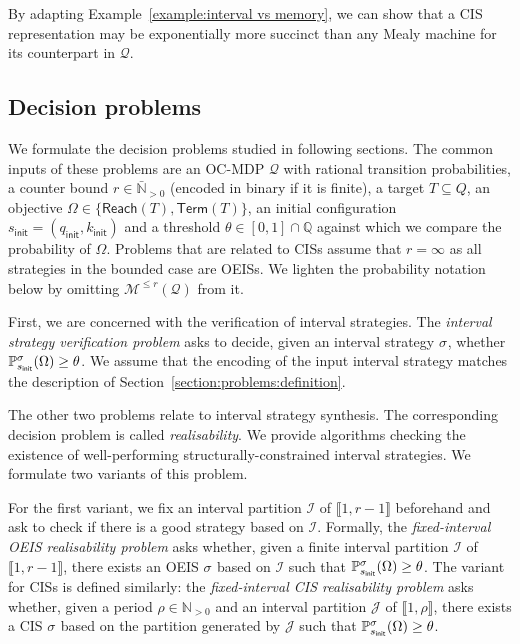 \documentclass[a4paper,UKenglish,cleveref,autoref,thm-restate,colorlinks]{lipics-v2021}
\newcommand{\init}{\mathsf{init}}
\newcommand{\integerInterval}[1]{\llbracket{}#1\rrbracket{}}
\newcommand{\ccInt}[2]{\left[#1, #2\right]}
\newcommand{\IN}{\mathbb{N}}
\newcommand{\INpos}{\IN_{>0}}
\newcommand{\IQ}{\mathbb{Q}}
\newcommand{\INposBar}{\bar{\IN}_{>0}}
\newcommand{\mdp}{\mathcal{M}}
\newcommand{\ocmdp}{\mathcal{Q}}
\newcommand{\ocmdpFin}[2]{\mdp^{\leq #2}(#1)}
\newcommand{\ocStateSpace}{Q}
\newcommand{\ocState}{q}
\newcommand{\ocCount}{k}
\newcommand{\ocConfig}{s}
\newcommand{\counterUB}{r}
\newcommand{\period}{\rho}
\newcommand{\intPart}{\mathcal{I}}
\newcommand{\intPartB}{\mathcal{J}}
\newcommand{\objective}{\Omega}
\newcommand{\reach}[1]{\mathsf{Reach}(#1)}
\newcommand{\target}{T}
\newcommand{\termination}{\mathsf{Term}}
\newcommand{\selectiveTermination}[1]{\termination({#1})}
\newcommand{\thresProba}{\theta}
\newcommand{\stratGeneric}[1]{{\sigma_{#1}}}
\newcommand{\strat}{\stratGeneric{}}
\begin{document}
By adapting Example~\ref{example:interval vs memory}, we can show that a CIS representation may be exponentially more succinct than any Mealy machine for its counterpart in $\ocmdp$.

\subsection{Decision problems}\label{section:problems:statements}

We formulate the decision problems studied in following sections.
The common inputs of these problems are an OC-MDP $\ocmdp$ with rational transition probabilities, a counter bound $\counterUB\in\INposBar$ (encoded in binary if it is finite), a target $\target\subseteq\ocStateSpace$, an objective $\objective\in\{\reach{\target}, \selectiveTermination{\target}\}$, an initial configuration $\ocConfig_\init = (\ocState_\init, \ocCount_\init)$ and a threshold $\thresProba\in\ccInt{0}{1}\cap\IQ$ against which we compare the probability of $\objective$.
Problems that are related to CISs assume that $\counterUB=\infty$ as all strategies in the bounded case are OEISs.
We lighten the probability notation below by omitting $\ocmdpFin{\ocmdp}{\counterUB}$ from it.

First, we are concerned with the verification of interval strategies.
The \textit{interval strategy verification problem} asks to decide, given an interval strategy $\strat$, whether $\probaG{\ocConfig_\init}{\strat}(\objective)\geq\thresProba$.
We assume that the encoding of the input interval strategy matches the description of Section~\ref{section:problems:definition}.

The other two problems relate to interval strategy synthesis.
The corresponding decision problem is called \textit{realisability}.
We provide algorithms checking the existence of well-performing structurally-constrained interval strategies.
We formulate two variants of this problem.

For the first variant, we fix an interval partition $\intPart$ of $\integerInterval{1, \counterUB-1}$ beforehand and ask to check if there is a good strategy based on $\intPart$.
Formally, the \textit{fixed-interval OEIS realisability problem} asks whether, given a finite interval partition $\intPart$ of $\integerInterval{1, \counterUB-1}$, there exists an OEIS $\strat$ based on $\intPart$ such that $\probaG{\ocConfig_\init}{\strat}(\objective)\geq\thresProba$.
The variant for CISs is defined similarly: the \textit{fixed-interval CIS realisability problem} asks whether, given a period $\period\in\INpos$ and an interval partition $\intPartB$ of $\integerInterval{1, \period}$, there exists a CIS $\strat$ based on the partition generated by $\intPartB$ such that $\probaG{\ocConfig_\init}{\strat}(\objective)\geq\thresProba$.
\end{document}
